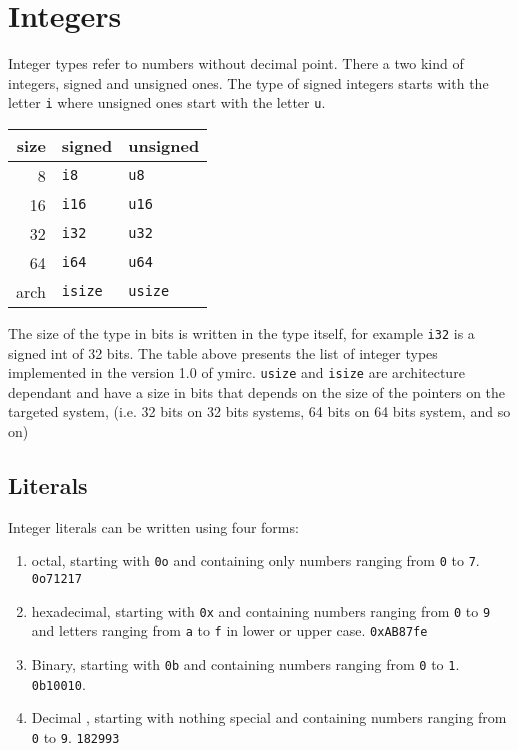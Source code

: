 \section{Integers}
\label{sec:orga8b7d2e}

Integer types refer to numbers without decimal point. There a two kind of
integers, signed and unsigned ones. The type of signed integers starts with the
letter \texttt{i} where unsigned ones start with the letter \texttt{u}.

\begin{center}
  \begin{tabular}{|r|ll|}
    \hline
    size & signed & unsigned\\[0pt]
    \hline
    \hline
    8 & \texttt{i8} & \texttt{u8}\\[0pt]
    16 & \texttt{i16} & \texttt{u16}\\[0pt]
    32 & \texttt{i32} & \texttt{u32}\\[0pt]
    64 & \texttt{i64} & \texttt{u64}\\[0pt]
    arch & \texttt{isize} & \texttt{usize}\\[0pt]
    \hline
  \end{tabular}
\end{center}

The size of the type in bits is written in the type itself, for example
\texttt{i32} is a signed int of 32 bits. The table above presents the list
of integer types implemented in the version 1.0 of ymirc. \texttt{usize} and
\texttt{isize} are architecture dependant and have a size in bits that depends
on the size of the pointers on the targeted system, (i.e. 32 bits on 32 bits
systems, 64 bits on 64 bits system, and so on)


\vspace{-10pt}%
\subsection{Literals}
\label{sec:org2cf045d}

Integer literals can be written using four forms:
\begin{enumerate}
\item octal, starting with \texttt{0o} and containing only numbers ranging from \texttt{0} to \texttt{7}.
  \texttt{0o71217}
  \vspace{-2pt}%
\item hexadecimal, starting with \texttt{0x} and containing numbers ranging from \texttt{0} to \texttt{9} and letters ranging from \texttt{a} to \texttt{f} in lower or upper case.
  \texttt{0xAB87fe}
  \vspace{-2pt}%
\item Binary, starting with \texttt{0b} and containing numbers ranging from \texttt{0} to \texttt{1}. \texttt{0b10010}.
  \vspace{-2pt}%
\item Decimal , starting with nothing special and containing numbers ranging from \texttt{0} to \texttt{9}.
  \texttt{182993}
\end{enumerate}

